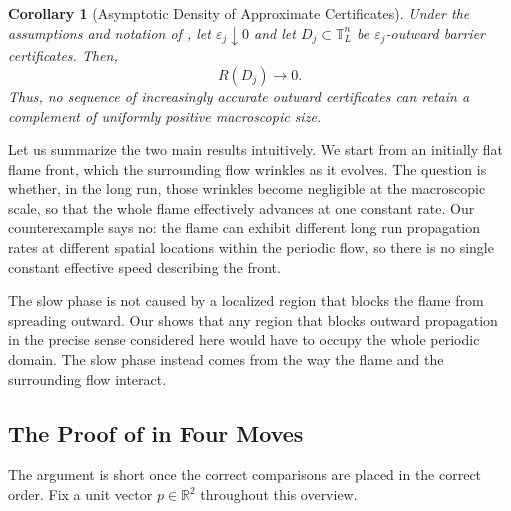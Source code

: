 \documentclass[11pt,reqno,noamsfonts]{amsart}
\newtheorem{corollary}[theorem]{Corollary}
\theoremstyle{definition}
\theoremstyle{remark}
\newcommand{\T}{\mathbb T}
\begin{document}
\begin{corollary}[Asymptotic Density of Approximate Certificates]
\label{cor:barriers-dense}
Under the assumptions and notation of , let
$\varepsilon_j\downarrow0$ and let $D_j\subset\T_L^n$ be
$\varepsilon_j$-outward barrier certificates.  Then,
\[
  R(D_j)\longrightarrow0.
\]
Thus, no sequence of increasingly accurate outward certificates can
retain a complement of uniformly positive macroscopic size.
\end{corollary}



Let us summarize the two main results intuitively. We start from an
initially flat flame front, which the surrounding flow wrinkles as it
evolves. The question is whether, in the long run, those wrinkles become
negligible at the macroscopic scale, so that the whole flame effectively
advances at one constant rate. Our counterexample says no: the flame can
exhibit different long run propagation rates at different spatial
locations within the periodic flow, so there is no single constant
effective speed describing the front.

The slow phase is not caused by a localized region that blocks the
flame from spreading outward.  Our  shows that any region
that blocks outward propagation in the precise sense considered here
would have to occupy the whole periodic domain.  The slow phase instead
comes from the way the flame and the surrounding flow interact.

\subsection{The Proof of  in Four Moves}\label{proof-overview}
The argument is short once the correct comparisons are placed in the correct order. Fix a unit vector $p\in\mathbb R^2$ throughout this overview.
\end{document}
